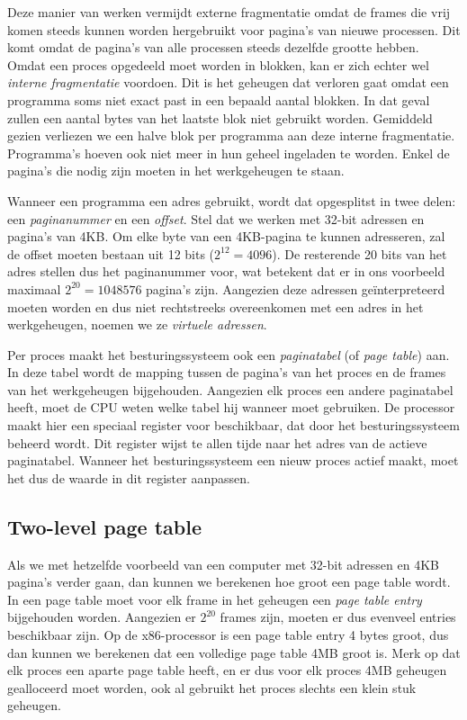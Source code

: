 
Deze manier van werken vermijdt externe fragmentatie omdat de frames die vrij komen steeds kunnen worden hergebruikt voor pagina's van nieuwe processen. Dit komt omdat de pagina's van alle processen steeds dezelfde grootte hebben. Omdat een proces opgedeeld moet worden in blokken, kan er zich echter wel \emph{interne fragmentatie} voordoen. Dit is het geheugen dat verloren gaat omdat een programma soms niet exact past in een bepaald aantal blokken. In dat geval zullen een aantal bytes van het laatste blok niet gebruikt worden. Gemiddeld gezien verliezen we een halve blok per programma aan deze interne fragmentatie. Programma's hoeven ook niet meer in hun geheel ingeladen te worden. Enkel de pagina's die nodig zijn moeten in het werkgeheugen te staan.

Wanneer een programma een adres gebruikt, wordt dat opgesplitst in twee delen: een \emph{paginanummer} en een \emph{offset}. Stel dat we werken met 32-bit adressen en pagina's van 4KB. Om elke byte van een 4KB-pagina te kunnen adresseren, zal de offset moeten bestaan uit 12 bits ($2^{12} = 4096$). De resterende 20 bits van het adres stellen dus het paginanummer voor, wat betekent dat er in ons voorbeeld maximaal $2^{20} = 1048576$ pagina's zijn. Aangezien deze adressen ge\"interpreteerd moeten worden en dus niet rechtstreeks overeenkomen met een adres in het werkgeheugen, noemen we ze \emph{virtuele adressen}.

Per proces maakt het besturingssysteem ook een \emph{paginatabel} (of \emph{page table}) aan. In deze tabel wordt de mapping tussen de pagina's van het proces en de frames van het werkgeheugen bijgehouden. Aangezien elk proces een andere paginatabel heeft, moet de CPU weten welke tabel hij wanneer moet gebruiken. De processor maakt hier een speciaal register voor beschikbaar, dat door het besturingssysteem beheerd wordt. Dit register wijst te allen tijde naar het adres van de actieve paginatabel. Wanneer het besturingssysteem een nieuw proces actief maakt, moet het dus de waarde in dit register aanpassen.


\subsection{Two-level page table}

Als we met hetzelfde voorbeeld van een computer met 32-bit adressen en 4KB pagina's verder gaan, dan kunnen we berekenen hoe groot een page table wordt. In een page table moet voor elk frame in het geheugen een \emph{page table entry} bijgehouden worden. Aangezien er $2^{20}$ frames zijn, moeten er dus evenveel entries beschikbaar zijn. Op de x86-processor is een page table entry 4 bytes groot, dus dan kunnen we berekenen dat een volledige page table 4MB groot is. Merk op dat elk proces een aparte page table heeft, en er dus voor elk proces 4MB geheugen gealloceerd moet worden, ook al gebruikt het proces slechts een klein stuk geheugen.

